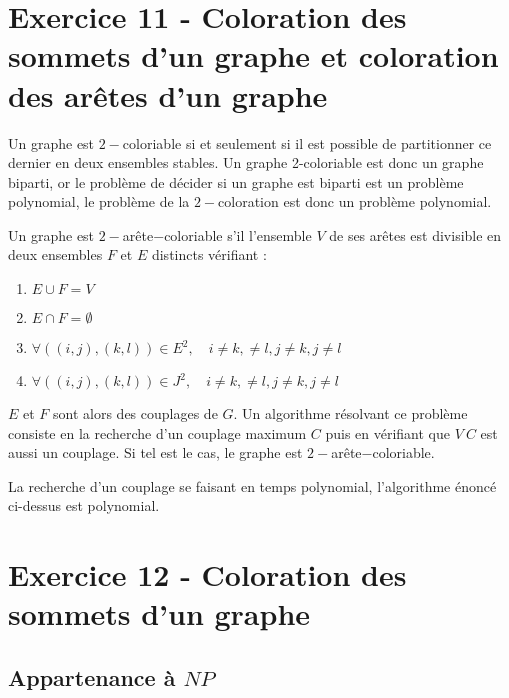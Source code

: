 \section{Exercice 11 - Coloration des sommets d'un graphe et coloration des arêtes d'un graphe}

Un graphe est $2-$coloriable si et seulement si il est possible de partitionner ce dernier en deux
ensembles stables. Un graphe 2-coloriable est donc un graphe biparti, or le problème de décider si
un graphe est biparti est un problème polynomial, le problème de la $2-$coloration est donc un
problème polynomial.

Un graphe est $2-$arête$-$coloriable s'il l'ensemble $V$ de ses arêtes est divisible en deux ensembles
$F$ et $E$ distincts vérifiant :
\begin{enumerate}
	\item $E \cup F = V$
	\item $E \cap F = \emptyset$
	\item $\forall ((i,j), (k,l)) \in E^2, \quad i \not = k, \not = l, j \not = k, j \not = l$
	\item $\forall ((i,j), (k,l)) \in J^2, \quad i \not = k, \not = l, j \not = k, j \not = l$
\end{enumerate}

$E$ et $F$ sont alors des couplages de $G$. Un algorithme résolvant ce problème consiste en la
recherche d'un couplage maximum $C$ puis en vérifiant que $V \ C$ est aussi un couplage. Si tel est
le cas, le graphe est $2-$arête$-$coloriable. 

La recherche d'un couplage se faisant en temps polynomial, l'algorithme énoncé ci-dessus est
polynomial.

\section{Exercice 12 - Coloration des sommets d'un graphe}

\subsection{Appartenance à $NP$}


